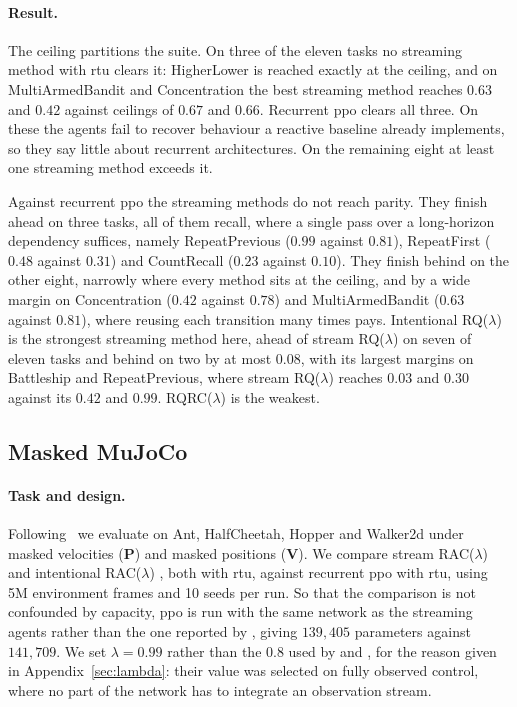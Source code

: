 \documentclass{article}
\begin{document}
\paragraph{Result.}
The ceiling partitions the suite. On three of the eleven tasks no streaming method with \gls{rtu} clears it:
HigherLower is reached exactly at the ceiling, and on MultiArmedBandit and Concentration the best
streaming method reaches $0.63$ and $0.42$ against ceilings of $0.67$ and $0.66$. Recurrent
\gls{ppo} clears all three. On these the agents fail to recover behaviour a reactive baseline
already implements, so they say little about recurrent architectures. On the remaining eight at least one streaming method exceeds it.

Against recurrent \gls{ppo} the streaming methods do not reach parity. They finish ahead on three tasks, all of them recall, where a single pass over a long-horizon dependency suffices, namely RepeatPrevious ($0.99$ against $0.81$), RepeatFirst ($0.48$ against $0.31$) and CountRecall ($0.23$ against $0.10$). They finish behind on the other eight, narrowly where every method sits at the ceiling, and by a wide margin on Concentration ($0.42$ against $0.78$) and MultiArmedBandit ($0.63$ against $0.81$), where reusing each transition many times pays. Intentional RQ($\lambda$) is the strongest streaming method here, ahead of stream RQ($\lambda$) on seven of eleven tasks and behind on two by at most $0.08$, with its largest margins on Battleship and RepeatPrevious, where stream RQ($\lambda$) reaches $0.03$ and $0.30$ against its $0.42$ and $0.99$. RQRC($\lambda$) is the weakest.

\subsection{Masked MuJoCo}


\label{sec:mujoco}
 
\paragraph{Task and design.}
Following~\citet{ni2022recurrent} we evaluate on Ant, HalfCheetah, Hopper and Walker2d under masked velocities (\textbf{P}) and masked positions (\textbf{V}).
We compare stream RAC($\lambda$) and intentional RAC($\lambda$) \citep{sharifnassab2026intentional}, both with \gls{rtu}, against recurrent \gls{ppo} with \gls{rtu}, using 5M environment frames and 10 seeds per run. So that the comparison is not confounded by capacity, \gls{ppo} is run with the same network as the streaming agents rather than the one reported by \citet{elelimy2024real}, giving $139{,}405$ parameters against $141{,}709$. We set $\lambda = 0.99$ rather than the $0.8$ used by \citet{elsayed2024streaming} and \citet{sharifnassab2026intentional}, for the reason given in Appendix~\ref{sec:lambda}: their value was selected on fully observed control, where no part of the network has to integrate an observation stream.
\end{document}
